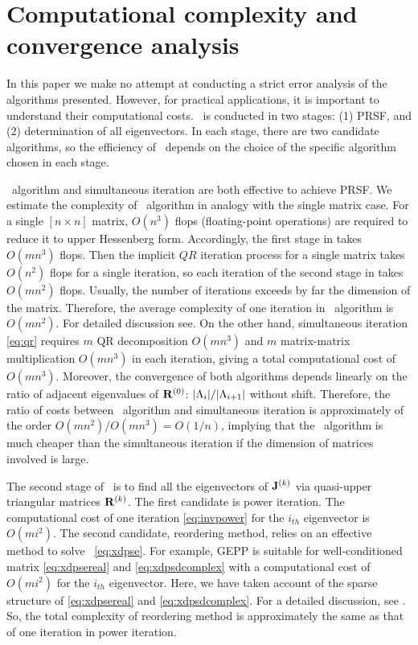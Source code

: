 \documentclass[final,leqno,onefignum,onetabnum]{siamltexmm}
\begin{document}
\section{Computational complexity and convergence analysis}
\label{sect:error}

In this paper we make no attempt at conducting a strict error analysis of
the algorithms presented. However, for practical applications,
it is important to understand their computational costs.
\Ped\ is conducted in two stages: (1) {PRSF},
and (2) determination of all
eigenvectors. In each stage, there are two candidate algorithms, so the
efficiency of \ped\ depends on the choice of the specific algorithm
chosen in each stage.

{
\Psd\ algorithm and simultaneous iteration are both effective to achieve
PRSF. We estimate the complexity of \psd\ algorithm in analogy
with the single matrix case.
For a single $[n\!\times\! n]$ matrix, $O(n^3)$
flops (floating-point operations) are required
to reduce it to upper Hessenberg form.
Accordingly, the first stage in
 takes $O(mn^3)$ flops.
Then the implicit $QR$ iteration process for a single matrix
takes $O(n^2)$ flops for
a single iteration, so each iteration of the second stage in
 takes $O(mn^2)$ flops.
Usually, the number of iterations exceeds by far the
dimension of the matrix. Therefore,  the average complexity of one
iteration in \psd\ algorithm is $O(mn^2)$. For detailed discussion
see.
On the other hand, simultaneous iteration
\eqref{eq:qr} requires
    }
$m$ QR decomposition $O(mn^{3})$ and $m$ matrix-matrix multiplication
$O(mn^{3})$ in each iteration, giving a total computational cost of
$O(mn^{3})$. {Moreover, the convergence of both algorithms} depends
linearly on the ratio of adjacent eigenvalues of $\mathbf{R}^{(0)}$:
$|\Lambda_{i}|/|\Lambda_{i+1}|$  without shift.
{Therefore,
the ratio of costs between \psd\ algorithm and simultaneous iteration
is approximately of the order $O(mn^2)/O(mn^3) = O(1/n)$,
implying that the \psd\ algorithm is much cheaper than the
simultaneous iteration if the dimension of matrices involved is large.}

The second stage of \ped\ is to find all the eigenvectors of
$\mathbf{J}^{(k)}$ via quasi-upper triangular matrices $\mathbf{R}^{(k)}$. The
first candidate is {power iteration.
The computational cost of one iteration \eqref{eq:invpower}} for the $i_{th}$
eigenvector is $O(mi^{2})$. The second candidate, reordering method,
relies on an effective method to solve \pse\ \eqref{eq:xdpse}. For
example, GEPP is suitable
for well-conditioned matrix \eqref{eq:xdpsereal} and
\eqref{eq:xdpsdcomplex} with a computational cost of {$O(mi^{2})$
for the $i_{th}$ eigenvector. Here, we have taken account of
the sparse structure of \eqref{eq:xdpsereal} and
\eqref{eq:xdpsdcomplex}. For a detailed discussion, see .
So, the total complexity of reordering method is approximately the same as
that of one iteration in power iteration.}
\end{document}

